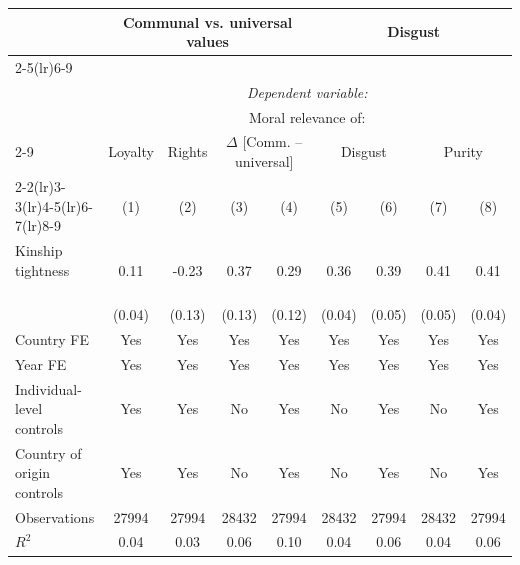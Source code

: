 {\begin{tabular}{l*{8}{c}}\toprule\toprule &\multicolumn{4}{c}{Communal vs. universal values} & \multicolumn{4}{c}{Disgust}\\\cmidrule(lr){2-5}\cmidrule(lr){6-9}\\ &\multicolumn{8}{c}{\textit{Dependent variable:}}\\[.1cm] & \multicolumn{8}{c}{Moral relevance of:}\\\cmidrule(lr){2-9} &\multicolumn{1}{c}{Loyalty}& \multicolumn{1}{c}{Rights} &\multicolumn{2}{c}{$\Delta$ [Comm. -- universal]} &\multicolumn{2}{c}{Disgust} & \multicolumn{2}{c}{Purity}\\\cmidrule(lr){2-2}\cmidrule(lr){3-3}\cmidrule(lr){4-5}\cmidrule(lr){6-7}\cmidrule(lr){8-9}
                &\multicolumn{1}{c}{(1)}         &\multicolumn{1}{c}{(2)}         &\multicolumn{1}{c}{(3)}         &\multicolumn{1}{c}{(4)}         &\multicolumn{1}{c}{(5)}         &\multicolumn{1}{c}{(6)}         &\multicolumn{1}{c}{(7)}         &\multicolumn{1}{c}{(8)}         \\
\midrule
Kinship tightness $\qquad$&     0.11\sym{**} &    -0.23\sym{*}  &     0.37\sym{***}&     0.29\sym{**} &     0.36\sym{***}&     0.39\sym{***}&     0.41\sym{***}&     0.41\sym{***}\\
                &   (0.04)         &   (0.13)         &   (0.13)         &   (0.12)         &   (0.04)         &   (0.05)         &   (0.05)         &   (0.04)         \\
\addlinespace
Country FE      &      Yes         &      Yes         &      Yes         &      Yes         &      Yes         &      Yes         &      Yes         &      Yes         \\
\addlinespace
Year FE         &      Yes         &      Yes         &      Yes         &      Yes         &      Yes         &      Yes         &      Yes         &      Yes         \\
\addlinespace
Individual-level controls&      Yes         &      Yes         &       No         &      Yes         &       No         &      Yes         &       No         &      Yes         \\
\addlinespace
Country of origin controls&      Yes         &      Yes         &       No         &      Yes         &       No         &      Yes         &       No         &      Yes         \\
\midrule
Observations    &    27994         &    27994         &    28432         &    27994         &    28432         &    27994         &    28432         &    27994         \\
\(R^{2}\)       &     0.04         &     0.03         &     0.06         &     0.10         &     0.04         &     0.06         &     0.04         &     0.06         \\
\bottomrule
\end{tabular}
}
